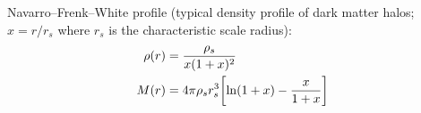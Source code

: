 		\noindent
		Navarro--Frenk--White profile (typical density profile of dark matter halos; $x=r/r_s$ where $r_s$ is the characteristic scale radius):
		\begin{align}
			\rho(r) &= \frac{\rho_s}{x(1+x)^2} \\
			M(r) &= 4\pi \rho_s r_s^3 \qty[\ln(1+x) - \frac{x}{1+x}]
		\end{align}
